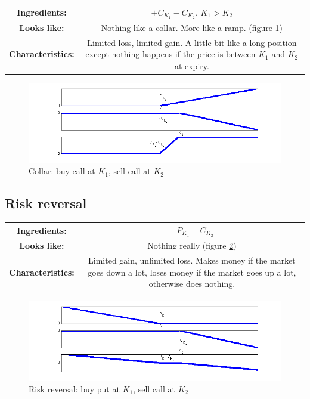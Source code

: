 \begin{center}
\begin{tabular}{|cc|}
\hline
\textbf{Ingredients:} &$+C_{K_1} -C_{K_2}$, $K_1>K_2$\\
\textbf{Looks like:}  & Nothing like a collar. More like a ramp. (figure \ref{fig:CK1mCK2})\\
\textbf{Characteristics:} & \parbox{3in}{Limited loss, limited gain. A little bit like a long position except nothing
happens if the price is between $K_1$ and $K_2$ at expiry.}\\
\hline
\end{tabular}
\end{center}

  \begin{figure}[ht]
\centering
  \includegraphics[width=5in] {pics/CK1mCK2}
\caption{Collar: buy call at $K_1$, sell call at $K_2$}
\label{fig:CK1mCK2}
\end{figure}

\subsection{Risk reversal}

\begin{center}
\begin{tabular}{|cc|}
\hline
\textbf{Ingredients:} &$+P_{K_1}  - C_{K_2}$\\
\textbf{Looks like:}  & Nothing really (figure \ref{fig:PK1mCK2})\\
\textbf{Characteristics:} & \parbox{3in}{Limited gain, unlimited loss. Makes money if the market goes down a lot, loses money if the market goes up a lot, otherwise does nothing.}\\
\hline
\end{tabular}
\end{center}


 \begin{figure}[ht]
\centering
  \includegraphics[width=5in] {pics/PK1mCK2}
\caption{Risk reversal: buy put at $K_1$, sell call at $K_2$}
\label{fig:PK1mCK2}
\end{figure}


